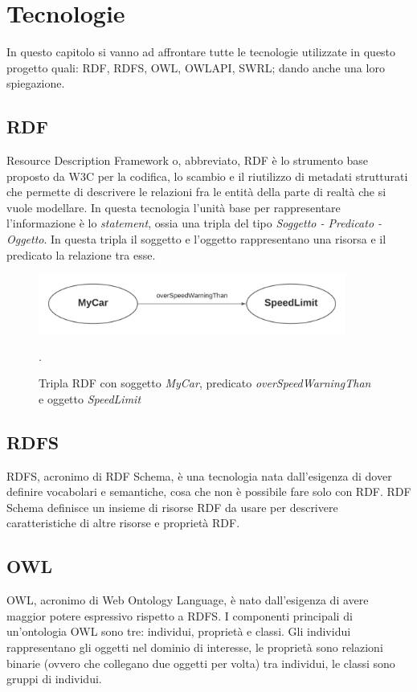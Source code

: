 \chapter{Tecnologie}
In questo capitolo si vanno ad affrontare tutte le tecnologie utilizzate in questo progetto quali: RDF, RDFS, OWL, OWLAPI, SWRL; dando anche una loro spiegazione.
\section{RDF}
Resource Description Framework o, abbreviato, RDF \`e lo strumento base proposto da W3C per la codifica, lo scambio e il riutilizzo di metadati strutturati che permette di descrivere le relazioni fra le entit\`a della parte di realt\`a che si vuole modellare.
In questa tecnologia l'unit\`a base per rappresentare l'informazione \`e lo \textit{statement}, ossia una tripla del tipo \textit{Soggetto - Predicato - Oggetto}.
In questa tripla il soggetto e l'oggetto rappresentano una risorsa e il predicato la relazione tra esse. \cite{rdf}

\begin{figure}[h!]
    \centering
    \includegraphics[width=0.90\textwidth]{img/overSpeedWarningThanRDF.png}
   	\caption{Tripla RDF con soggetto \textit{MyCar}, predicato \textit{overSpeedWarningThan} e oggetto \textit{SpeedLimit}}.
	\label{fig:triplaRDF}
\end{figure}

\section{RDFS}
RDFS, acronimo di RDF Schema, \`e una tecnologia nata dall'esigenza di dover definire vocabolari e semantiche, cosa che non \`e possibile fare solo con RDF.
RDF Schema definisce un insieme di risorse RDF da usare per descrivere caratteristiche di altre risorse e propriet\`a RDF. \cite{rdfs}

\section{OWL}
OWL, acronimo di Web Ontology Language, \`e nato dall'esigenza di avere maggior potere espressivo rispetto a RDFS.
I componenti principali di un'ontologia OWL sono tre: individui, propriet\`a e classi. Gli individui rappresentano gli oggetti nel dominio di interesse, le propriet\`a sono relazioni binarie (ovvero che collegano due oggetti per volta) tra individui, le classi sono gruppi di individui.
\cite{owl}

